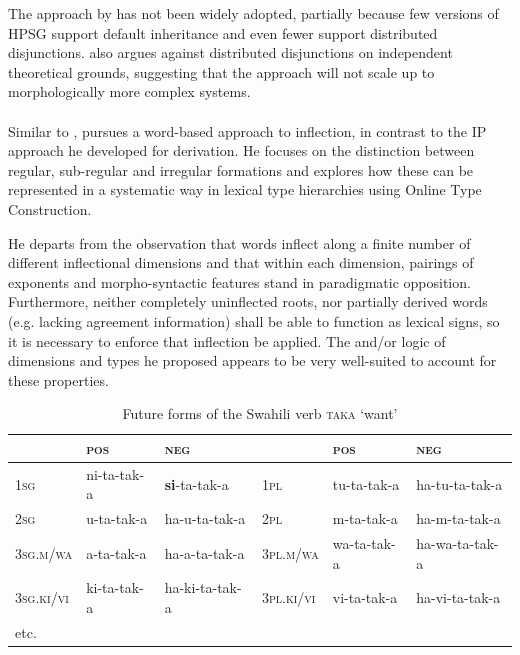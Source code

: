 The approach by \citet{Krieger:Nerbonne:93} has not been widely
adopted, partially because few versions of HPSG support default
inheritance and even fewer support distributed
disjunctions. \citet[176--178]{Koenig99} also argues against distributed
disjunctions on independent theoretical grounds, suggesting that the
approach will not scale up to morphologically more complex systems.  

\paragraph*{\citet{Koenig99}}

Similar to \citet{Krieger:Nerbonne:93}, \citet{Koenig99} pursues a
word-based approach to inflection, in contrast to the IP approach he
developed for derivation. He focuses on the distinction between
regular, sub-regular and irregular formations and explores how these
can be represented in a systematic way in lexical type hierarchies
using Online Type Construction.

He departs from the observation that words  inflect along a finite number
of different inflectional dimensions and that within each dimension,
pairings of exponents and morpho-syntactic features stand in
paradigmatic opposition. Furthermore, neither completely uninflected
roots, nor partially derived words (e.g. lacking agreement
information) shall be able to function as lexical signs, so it is
necessary to enforce that inflection be applied. The and/or
logic of dimensions and types he proposed appears to be very
well-suited to account for these properties. 

\begin{table}
\setlength{\tabcolsep}{.3em}
\centering
\begin{tabular}{llllll}
\toprule 
 & \textsc{pos} & \textsc{neg}     &             & \textsc{pos} & \textsc{neg}\\
\midrule 
\textsc{1sg} & ni-{ta}-tak-{a} & \textbf{{si}}-{ta}-tak-{a}        & \textsc{1pl} & tu-{ta}-tak-{a}     & {ha}-tu-{ta}-tak-{a}\\
\textsc{2sg} & u-{ta}-tak-{a} & {ha}-u-{ta}-tak-{a}        & \textsc{2pl} & m-{ta}-tak-{a}      & {ha}-m-{ta}-tak-{a}\\
\textsc{3sg.m/wa} & a-{ta}-tak-{a} & {ha}-a-{ta}-tak-{a}    & \textsc{3pl.m/wa} & wa-{ta}-tak-{a} & {ha}-wa-{ta}-tak-{a}\\ 
\textsc{3sg.ki/vi} & ki-{ta}-tak-{a} & {ha}-ki-{ta}-tak-{a} & \textsc{3pl.ki/vi} & vi-{ta}-tak-{a} & {ha}-vi-{ta}-tak-{a}\\
etc. & &\\
\bottomrule
\end{tabular}
\caption{Future forms of the Swahili verb  \textsc{taka} ‘want’}
\label{tab:SwahiliPast}
\end{table}


